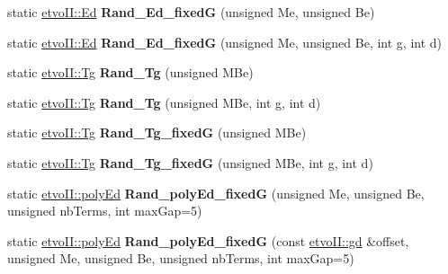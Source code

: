 \begin{DoxyCompactItemize}
static \mbox{\hyperlink{classetvo_i_i_1_1_ed}{etvo\+I\+I\+::\+Ed}} {\bfseries Rand\+\_\+\+Ed\+\_\+fixedG} (unsigned Me, unsigned Be)
\item 
\mbox{\label{classetvo_i_i_1_1rand_gen_aa5f7ee429f8ac5603d05eb7e9b9e76ce}} 
static \mbox{\hyperlink{classetvo_i_i_1_1_ed}{etvo\+I\+I\+::\+Ed}} {\bfseries Rand\+\_\+\+Ed\+\_\+fixedG} (unsigned Me, unsigned Be, int g, int d)
\item 
\mbox{\label{classetvo_i_i_1_1rand_gen_ac1971471dd5fd1dfb701a793fa85b0f9}} 
static \mbox{\hyperlink{classetvo_i_i_1_1_tg}{etvo\+I\+I\+::\+Tg}} {\bfseries Rand\+\_\+\+Tg} (unsigned M\+Be)
\item 
\mbox{\label{classetvo_i_i_1_1rand_gen_aedfca967a86433dc52ae3369f37dddbc}} 
static \mbox{\hyperlink{classetvo_i_i_1_1_tg}{etvo\+I\+I\+::\+Tg}} {\bfseries Rand\+\_\+\+Tg} (unsigned M\+Be, int g, int d)
\item 
\mbox{\label{classetvo_i_i_1_1rand_gen_a4cee5b998d862ddea1cf0662be8729a2}} 
static \mbox{\hyperlink{classetvo_i_i_1_1_tg}{etvo\+I\+I\+::\+Tg}} {\bfseries Rand\+\_\+\+Tg\+\_\+fixedG} (unsigned M\+Be)
\item 
\mbox{\label{classetvo_i_i_1_1rand_gen_a037c88b962068630eb83cd520793a192}} 
static \mbox{\hyperlink{classetvo_i_i_1_1_tg}{etvo\+I\+I\+::\+Tg}} {\bfseries Rand\+\_\+\+Tg\+\_\+fixedG} (unsigned M\+Be, int g, int d)
\item 
\mbox{\label{classetvo_i_i_1_1rand_gen_a61e9c09c412bb5379613875156ab2eda}} 
static \mbox{\hyperlink{classetvo_i_i_1_1poly_ed}{etvo\+I\+I\+::poly\+Ed}} {\bfseries Rand\+\_\+poly\+Ed\+\_\+fixedG} (unsigned Me, unsigned Be, unsigned nb\+Terms, int max\+Gap=5)
\item 
\mbox{\label{classetvo_i_i_1_1rand_gen_a33980f4ee6a8365039ad02716df018a9}} 
static \mbox{\hyperlink{classetvo_i_i_1_1poly_ed}{etvo\+I\+I\+::poly\+Ed}} {\bfseries Rand\+\_\+poly\+Ed\+\_\+fixedG} (const \mbox{\hyperlink{classetvo_i_i_1_1gd}{etvo\+I\+I\+::gd}} \&offset, unsigned Me, unsigned Be, unsigned nb\+Terms, int max\+Gap=5)
\item 

\end{DoxyCompactItemize}
